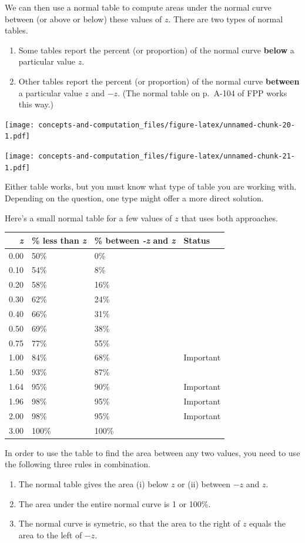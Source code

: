\documentclass[]{book}
\providecommand{\tightlist}{%
  \setlength{\itemsep}{0pt}\setlength{\parskip}{0pt}}
\begin{document}
We can then use a normal table to compute areas under the normal curve between (or above or below) these values of \(z\). There are two types of normal tables.

\begin{enumerate}
\def\labelenumi{\arabic{enumi}.}
\tightlist
\item
  Some tables report the percent (or proportion) of the normal curve \textbf{below} a particular value \(z\).
\item
  Other tables report the percent (or proportion) of the normal curve \textbf{between} a particular value \(z\) and \(-z\). (The normal table on p.~A-104 of FPP works this way.)
\end{enumerate}

\texttt{[image: concepts-and-computation\_files/figure-latex/unnamed-chunk-20-1.pdf]}

\texttt{[image: concepts-and-computation\_files/figure-latex/unnamed-chunk-21-1.pdf]}

Either table works, but you must know what type of table you are working with. Depending on the question, one type might offer a more direct solution.

Here's a small normal table for a few values of \(z\) that uses both approaches.

\begin{longtable}[]{@{}rlll@{}}
\toprule
\emph{z} & \% less than \emph{z} & \% between \emph{-z} and \emph{z} & Status\tabularnewline
\midrule
\endhead
0.00 & 50\% & 0\% &\tabularnewline
0.10 & 54\% & 8\% &\tabularnewline
0.20 & 58\% & 16\% &\tabularnewline
0.30 & 62\% & 24\% &\tabularnewline
0.40 & 66\% & 31\% &\tabularnewline
0.50 & 69\% & 38\% &\tabularnewline
0.75 & 77\% & 55\% &\tabularnewline
1.00 & 84\% & 68\% & Important\tabularnewline
1.50 & 93\% & 87\% &\tabularnewline
1.64 & 95\% & 90\% & Important\tabularnewline
1.96 & 98\% & 95\% & Important\tabularnewline
2.00 & 98\% & 95\% & Important\tabularnewline
3.00 & 100\% & 100\% &\tabularnewline
\bottomrule
\end{longtable}

In order to use the table to find the area between any two values, you need to use the following three rules in combination.

\begin{enumerate}
\def\labelenumi{\arabic{enumi}.}
\tightlist
\item
  The normal table gives the area (i) below \(z\) or (ii) between \(-z\) and \(z\).
\item
  The area under the entire normal curve is 1 or 100\%.
\item
  The normal curve is symetric, so that the area to the right of \(z\) equals the area to the left of \(-z\).
\end{enumerate}
\end{document}
